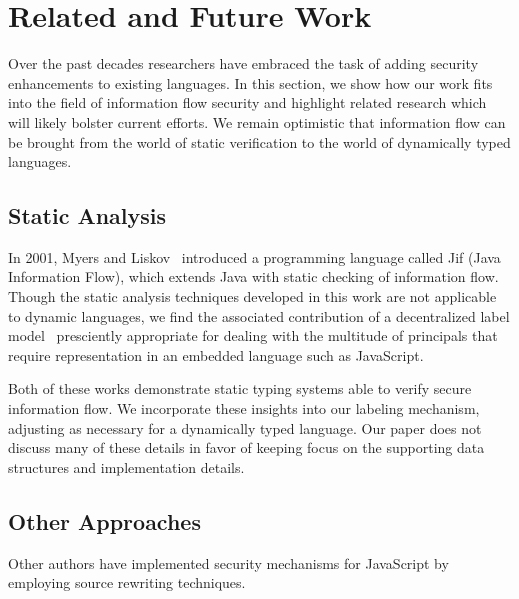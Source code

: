
 \section{Related and Future Work}
\label{sec:relatedwork}


Over the past decades researchers have embraced the task of adding security enhancements to existing languages.
In this section, we show how our work fits into the field of information flow security and highlight related research which will likely bolster current efforts.
We remain optimistic that information flow can be brought from the world of static verification to the world of dynamically typed languages.

\subsection{Static Analysis}


In 2001, Myers and Liskov~\cite{myers2001jif} introduced a programming language called Jif (Java Information Flow), which extends Java with static checking of information flow.
Though the static analysis techniques developed in this work are not applicable to dynamic languages, we find the associated contribution of a decentralized label model~\cite{363526} presciently appropriate for dealing with the multitude of principals that require representation in an embedded language such as JavaScript.

Both of these works demonstrate static typing systems able to verify secure information flow.
We incorporate these insights into our labeling mechanism, adjusting as necessary for a dynamically typed language.
Our paper does not discuss many of these details in favor of keeping focus on the supporting data structures and implementation details.

\subsection{Other Approaches}

Other authors have implemented security mechanisms for JavaScript by employing source rewriting techniques.

